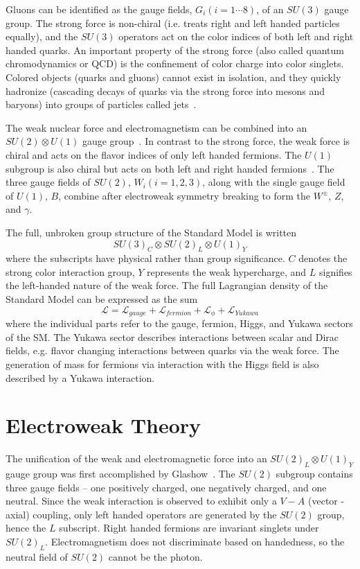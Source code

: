 Gluons can be identified as the gauge fields, $G_i (i=1\cdots8)$, of an $SU(3)$ gauge group. The strong force is non-chiral (i.e. treats right and left handed particles equally), and the $SU(3)$ operators act on the color indices of both left and right handed quarks. An important property of the strong force (also called quantum chromodynamics or QCD) is the confinement of color charge into color singlets. Colored objects (quarks and gluons) cannot exist in isolation, and they quickly hadronize (cascading decays of quarks via the strong force into mesons and baryons) into groups of particles called jets~\cite{Green, HiggsHunter}.

The weak nuclear force and electromagnetism can be combined into an $SU(2)\otimes U(1)$ gauge group~\cite{Weinberg:1967tq}. In contrast to the strong force, the weak force is chiral and acts on the flavor indices of only left handed fermions. The $U(1)$ subgroup is also chiral but acts on both left and right handed fermions~\cite{Rolnick}. The three gauge fields of $SU(2)$, $W_i (i=1,2,3)$, along with the single gauge field of $U(1)$, $B$, combine after electroweak symmetry breaking to form the $W^\pm$, $Z$, and $\gamma$.

The full, unbroken group structure of the Standard Model is written
\begin{equation}
SU(3)_C\otimes SU(2)_L\otimes U(1)_Y
\end{equation}
where the subscripts have physical rather than group significance. $C$ denotes the strong color interaction group, $Y$ represents the weak hypercharge, and $L$ signifies the left-handed nature of the weak force. The full Lagrangian density of the Standard Model can be expressed as the sum
\begin{equation}
\mathcal{L} = \mathcal{L}_{gauge} + \mathcal{L}_{fermion} + \mathcal{L}_{\phi} + \mathcal{L}_{Yukawa}
\end{equation}
where the individual parts refer to the gauge, fermion, Higgs, and Yukawa sectors of the SM. The Yukawa sector describes interactions between scalar and Dirac fields, e.g. flavor changing interactions between quarks via the weak force. The generation of mass for fermions via interaction with the Higgs field is also described by a Yukawa interaction.
\section{Electroweak Theory}
The unification of the weak and electromagnetic force into an $SU(2)_L\otimes U(1)_Y$ gauge group was first accomplished by Glashow~\cite{Glashow:1961tr}. The $SU(2)$ subgroup contains three gauge fields -- one positively charged, one negatively charged, and one neutral. Since the weak interaction is observed to exhibit only a $V-A$ (vector - axial) coupling, only left handed operators are generated by the $SU(2)$ group, hence the $L$ subscript. Right handed fermions are invariant singlets under $SU(2)_L$. Electromagnetism does not discriminate based on handedness, so the neutral field of $SU(2)$ cannot be the photon.

